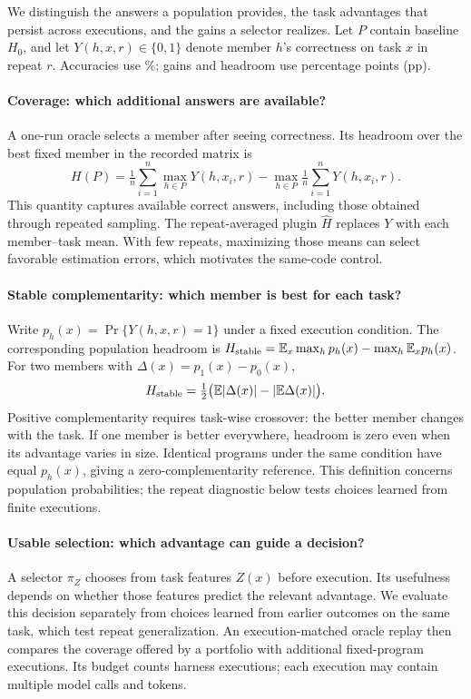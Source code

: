 We distinguish the answers a population provides, the task advantages
that persist across executions, and the gains a selector realizes.
Let $P$ contain baseline $H_0$, and let $Y(h,x,r)\in\{0,1\}$ denote
member $h$'s correctness on task $x$ in repeat $r$. Accuracies use
\%; gains and headroom use percentage points (pp).

\paragraph{Coverage: which additional answers are available?}
A one-run oracle selects a member after seeing correctness. Its
headroom over the best fixed member in the recorded matrix is
\begin{equation}
H(P)=\tfrac1n\sum_{i=1}^n\max_{h\in P}Y(h,x_i,r)
-\max_{h\in P}\tfrac1n\sum_{i=1}^nY(h,x_i,r).
\label{eq:headroom}
\end{equation}
This quantity captures available correct answers, including those
obtained through repeated sampling. The repeat-averaged plugin
$\widehat H$ replaces $Y$ with each member--task mean. With few repeats,
maximizing those means can select favorable estimation errors,
which motivates the same-code control.

\paragraph{Stable complementarity: which member is best for each task?}
Write $p_h(x)=\Pr\{Y(h,x,r)=1\}$ under a fixed execution condition.
The corresponding population headroom is
$H_{\rm stable}=\mathbb E_x\max_h p_h(x)-\max_h\mathbb E_x p_h(x)$.
For two members with $\Delta(x)=p_1(x)-p_0(x)$,
\begin{equation}
H_{\rm stable}=\tfrac12\bigl(\mathbb E|\Delta(x)|-|\mathbb E\Delta(x)|\bigr).
\label{eq:identity}
\end{equation}
Positive complementarity requires task-wise crossover: the better
member changes with the task. If one member is better everywhere,
headroom is zero even when its advantage varies in size. Identical
programs under the same condition have equal $p_h(x)$, giving a
zero-complementarity reference. This definition concerns population
probabilities; the repeat diagnostic below tests choices learned from
finite executions.

\paragraph{Usable selection: which advantage can guide a decision?}
A selector $\pi_Z$ chooses from task features $Z(x)$ before execution.
Its usefulness depends on whether those features predict the relevant
advantage. We evaluate this decision separately from choices learned
from earlier outcomes on the same task, which test repeat
generalization. An execution-matched oracle replay then compares the
coverage offered by a portfolio with additional fixed-program
executions. Its budget counts harness executions; each execution may
contain multiple model calls and tokens.
